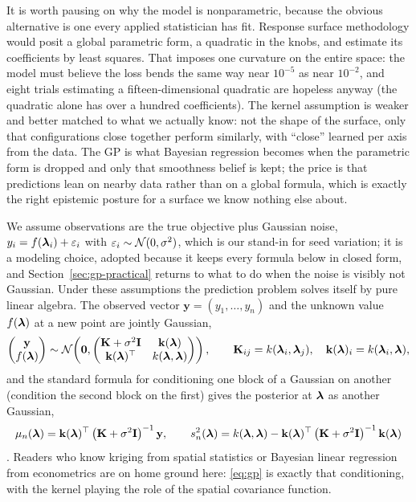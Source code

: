 It is worth pausing on why the model is nonparametric, because the
obvious alternative is one every applied statistician has fit. Response
surface methodology would posit a global parametric form, a quadratic in
the knobs, and estimate its coefficients by least squares. That imposes
one curvature on the entire space: the model must believe the loss bends
the same way near $10^{-5}$ as near $10^{-2}$, and eight trials estimating
a fifteen-dimensional quadratic are hopeless anyway (the quadratic alone
has over a hundred coefficients). The kernel assumption is weaker and
better matched to what we actually know: not the shape of the surface,
only that configurations close together perform similarly, with
``close'' learned per axis from the data. The GP is what Bayesian
regression becomes when the parametric form is dropped and only that
smoothness belief is kept; the price is that predictions lean on nearby
data rather than on a global formula, which is exactly the right
epistemic posture for a surface we know nothing else about.

We assume observations are the true objective plus Gaussian noise,
$y_i = f(\bm{\lambda}_i) + \varepsilon_i$ with
$\varepsilon_i \sim \mathcal{N}(0, \sigma^2)$, which is our stand-in for seed
variation; it is a modeling choice, adopted because it keeps every formula
below in closed form, and Section~\ref{sec:gp-practical} returns to what to
do when the noise is visibly not Gaussian. Under these assumptions the
prediction problem solves itself by pure linear algebra. The observed vector
$\mathbf{y} = (y_1, \dots, y_n)$ and the unknown value $f(\bm{\lambda})$ at a new
point are jointly Gaussian,
\begin{equation}
\begin{pmatrix} \mathbf{y} \\ f(\bm{\lambda}) \end{pmatrix}
\sim \mathcal{N}\!\left(
\mathbf{0},
\begin{pmatrix}
\mathbf{K} + \sigma^2 \mathbf{I} & \mathbf{k}(\bm{\lambda}) \\
\mathbf{k}(\bm{\lambda})^\top & k(\bm{\lambda}, \bm{\lambda})
\end{pmatrix}
\right),
\qquad
\mathbf{K}_{ij} = k(\bm{\lambda}_i, \bm{\lambda}_j),
\quad
\mathbf{k}(\bm{\lambda})_i = k(\bm{\lambda}_i, \bm{\lambda}),
\label{eq:joint}
\end{equation}
and the standard formula for conditioning one block of a Gaussian on
another (condition the second block on the first) gives the posterior at
$\bm{\lambda}$ as another Gaussian,
\begin{equation}
\mu_n(\bm{\lambda}) = \mathbf{k}(\bm{\lambda})^\top
\left( \mathbf{K} + \sigma^2 \mathbf{I} \right)^{-1} \mathbf{y},
\qquad
s_n^2(\bm{\lambda}) = k(\bm{\lambda}, \bm{\lambda}) - \mathbf{k}(\bm{\lambda})^\top
\left( \mathbf{K} + \sigma^2 \mathbf{I} \right)^{-1} \mathbf{k}(\bm{\lambda})
\label{eq:gp}
\end{equation}
\citep{rasmussen2006gaussian}. Readers who know kriging from spatial
statistics or Bayesian linear regression from econometrics are on home
ground here: \eqref{eq:gp} is exactly that conditioning, with the kernel
playing the role of the spatial covariance function.

